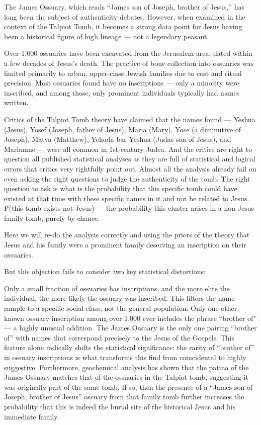 The James Ossuary, which reads ``James son of Joseph, brother of Jesus,'' has long been the subject of authenticity debates.
However, when examined in the context of the Talpiot Tomb, it becomes a strong data point for Jesus having been a historical figure of high lineage --- not a legendary peasant.

Over 1,000 ossuaries have been excavated from the Jerusalem area, dated within a few decades of Jesus's death.
The practice of bone collection into ossuaries was limited primarily to urban, upper-class Jewish families due to cost and ritual precision.
Most ossuaries found have no inscriptions --- only a minority were inscribed, and among those, only prominent individuals typically had names written.

Critics of the Talpiot Tomb theory have claimed that the names found --- Yeshua (Jesus), Yosef (Joseph, father of Jesus), Maria (Mary), Yose (a diminutive of Joseph), Matya (Matthew), Yehuda bar Yeshua (Judas son of Jesus), and Mariamne --- were all common in 1st-century Judea.
And the critics are right to question all published statistical analyses as they are full of statistical and logical errors that critics very rightfully point out.
Almost all the analysis already fail on even asking the right questions to judge the authenticity of the tomb.
The right question to ask is what is the probability that this specific tomb could have existed at that time with these specific names in it and not be related to Jesus.
P(this tomb exists \textbar{} not-Jesus) --- the probability this cluster arises in a non-Jesus family tomb, purely by chance.

Here we will re-do the analysis correctly and using the priors of the theory that Jesus and his family were a prominent family deserving an inscription on their ossuaries.

But this objection fails to consider two key statistical distortions:

Only a small fraction of ossuaries has inscriptions, and the more elite the individual, the more likely the ossuary was inscribed.
This filters the name sample to a specific social class, not the general population.
Only one other known ossuary inscription among over 1,000 ever includes the phrase ``brother of'' --- a highly unusual addition.
The James Ossuary is the only one pairing ``brother of'' with names that correspond precisely to the Jesus of the Gospels.
This feature alone radically shifts the statistical significance: the rarity of ``brother of'' in ossuary inscriptions is what transforms this find from coincidental to highly suggestive.
Furthermore, geochemical analysis has shown that the patina of the James Ossuary matches that of the ossuaries in the Talpiot tomb, suggesting it was originally part of the same tomb.
If so, then the presence of a ``James son of Joseph, brother of Jesus'' ossuary from that family tomb further increases the probability that this is indeed the burial site of the historical Jesus and his immediate family.

